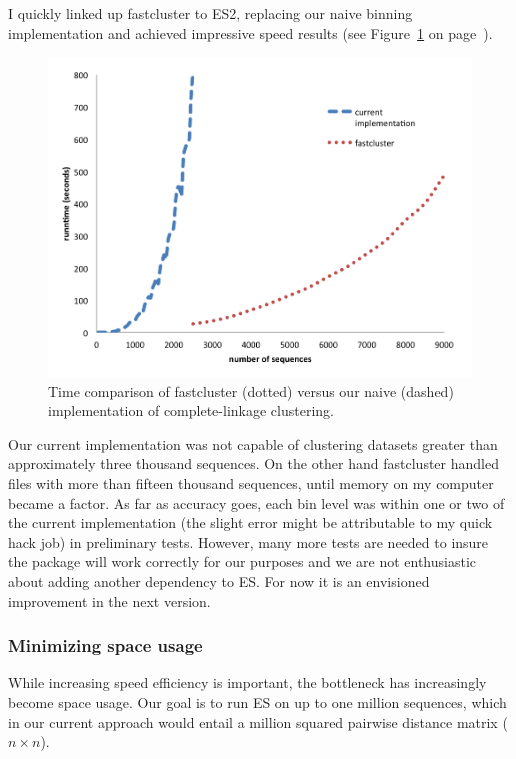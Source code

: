 I quickly linked up fastcluster to ES2, replacing our naive binning implementation and achieved impressive speed results (see Figure~\ref{fig:FastVsNaive} on page~\pageref{fig:FastVsNaive}).
\begin{figure}[h!]
\centering
\includegraphics[scale=.8]{images/FastVsNaive-CH3}
\caption[Time comparison of fastcluster versus our naive implementation of complete-linkage clustering.]{Time comparison of fastcluster (dotted) versus our naive (dashed) implementation of complete-linkage clustering.}
\label{fig:FastVsNaive}
\end{figure}
Our current implementation was not capable of clustering datasets greater than approximately three thousand sequences.
On the other hand fastcluster handled files with more than fifteen thousand sequences, until memory on my computer became a factor.
As far as accuracy goes, each bin level was within one or two of the current implementation (the slight error might be attributable to my quick hack job) in preliminary tests.
However, many more tests are needed to insure the package will work correctly for our purposes and we are not enthusiastic about adding another dependency to ES.
For now it is an envisioned improvement in the next version.

\subsubsection*{Minimizing space usage}
While increasing speed efficiency is important, the bottleneck has increasingly become space usage.
Our goal is to run ES on up to one million sequences, which in our current approach would entail a million squared pairwise distance matrix ($n \times n$).

